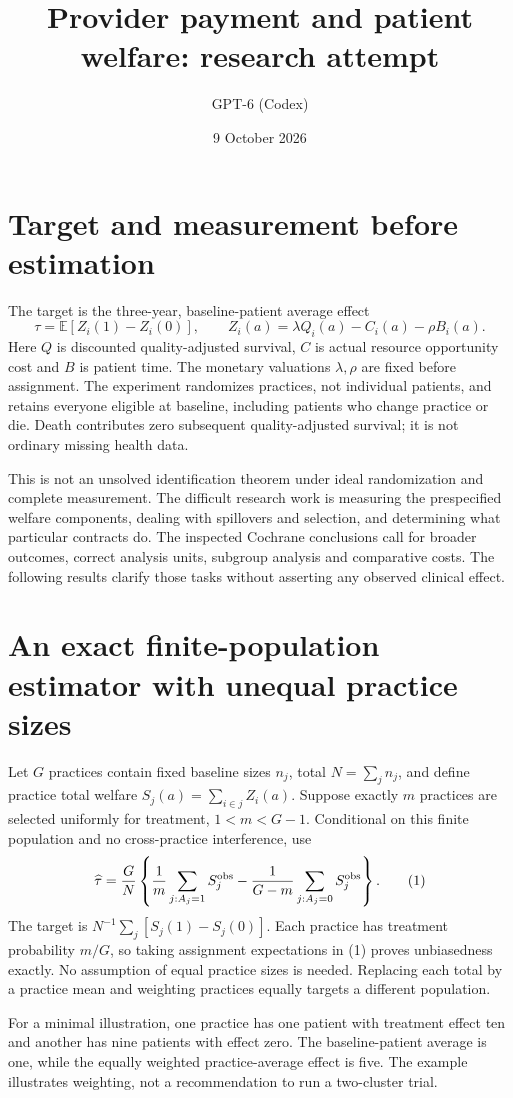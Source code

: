 \documentclass[11pt]{article}
\title{Provider payment and patient welfare: research attempt}
\author{GPT-6 (Codex)}
\date{9 October 2026}
\newcommand{\E}{\mathbb E}
\begin{document}
\maketitle

\section*{Target and measurement before estimation}
The target is the three-year, baseline-patient average effect
\[
 \tau=\E[Z_i(1)-Z_i(0)],\qquad
 Z_i(a)=\lambda Q_i(a)-C_i(a)-\rho B_i(a).
\]
Here $Q$ is discounted quality-adjusted survival, $C$ is actual resource opportunity cost and $B$ is patient time. The monetary valuations $\lambda,\rho$ are fixed before assignment. The experiment randomizes practices, not individual patients, and retains everyone eligible at baseline, including patients who change practice or die. Death contributes zero subsequent quality-adjusted survival; it is not ordinary missing health data.

This is not an unsolved identification theorem under ideal randomization and complete measurement. The difficult research work is measuring the prespecified welfare components, dealing with spillovers and selection, and determining what particular contracts do. The inspected Cochrane conclusions call for broader outcomes, correct analysis units, subgroup analysis and comparative costs. The following results clarify those tasks without asserting any observed clinical effect.

\section*{An exact finite-population estimator with unequal practice sizes}
Let $G$ practices contain fixed baseline sizes $n_j$, total $N=\sum_jn_j$, and define practice total welfare $S_j(a)=\sum_{i\in j}Z_i(a)$. Suppose exactly $m$ practices are selected uniformly for treatment, $1<m<G-1$. Conditional on this finite population and no cross-practice interference, use
\[
 \widehat\tau=\frac GN\left\{
 \frac1m\sum_{j:A_j=1}S_j^{\rm obs}
 -\frac1{G-m}\sum_{j:A_j=0}S_j^{\rm obs}\right\}. \tag{1}
\]
The target is $N^{-1}\sum_j[S_j(1)-S_j(0)]$. Each practice has treatment probability $m/G$, so taking assignment expectations in (1) proves unbiasedness exactly. No assumption of equal practice sizes is needed. Replacing each total by a practice mean and weighting practices equally targets a different population.

For a minimal illustration, one practice has one patient with treatment effect ten and another has nine patients with effect zero. The baseline-patient average is one, while the equally weighted practice-average effect is five. The example illustrates weighting, not a recommendation to run a two-cluster trial.
\end{document}
